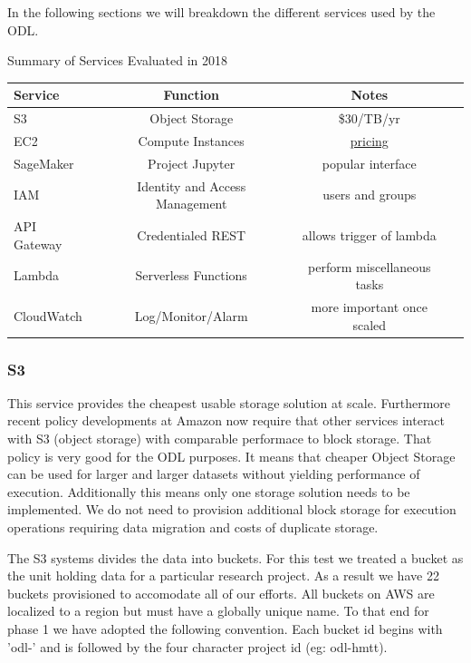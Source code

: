 In the following sections we will breakdown the different services used by the ODL.

\begin{table}[htbp]
\begin{center}
Summary of Services Evaluated in 2018
\begin{tabular}{lccr}
\hline
\hline
Service & Function & Notes \\
\hline
\hline
S3 & Object Storage & \$30/TB/yr \\
EC2 & Compute Instances & \href{https://aws.amazon.com/ec2/pricing/on-demand/}{pricing} \\
SageMaker & Project Jupyter & popular interface \\
IAM &  Identity and Access Management  & users and groups \\
API Gateway & Credentialed REST & allows trigger of lambda \\
Lambda & Serverless Functions & perform miscellaneous tasks\\
CloudWatch & Log/Monitor/Alarm & more important once scaled \\
\hline
\hline
\end{tabular}
\end{center}
\end{table}

\subsubsection{S3}
This service provides the cheapest usable storage solution at scale. Furthermore recent policy developments at Amazon now require that other services interact with S3 (object storage) with comparable performace to block storage. That policy is very good for the ODL purposes. It means that cheaper Object Storage can be used for larger and larger datasets without yielding performance of execution. Additionally this means only one storage solution needs to be implemented. We do not need to provision additional block storage for execution operations requiring data migration and costs of duplicate storage.

The S3 systems divides the data into buckets. For this test we treated a bucket as the unit holding data for a particular research project. As a result we have 22 buckets provisioned to accomodate all of our efforts. All buckets on AWS are localized to a region but must have a globally unique name. To that end for phase 1 we have adopted the following convention. Each bucket id begins with 'odl-' and is followed by the four character project id (eg: odl-hmtt).

